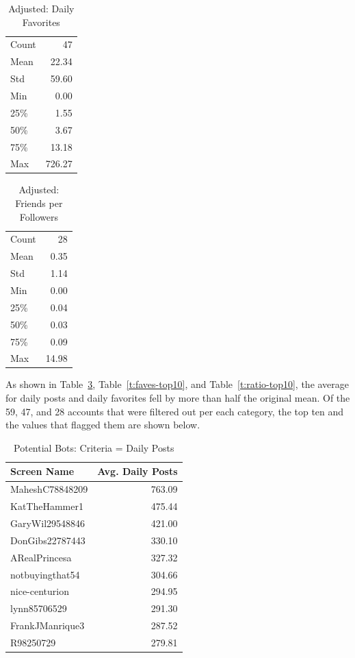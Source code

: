 \begin{table}[htb]
\centering
\caption{Adjusted: Daily Favorites}
\label{t:faves-delta}
\begin{tabular}{lr}
Count & 47  \\
Mean  & 22.34  \\
Std   & 59.60  \\
Min   & 0.00   \\
25\%  & 1.55   \\
50\%  & 3.67   \\
75\%  & 13.18  \\
Max   & 726.27
\end{tabular}
\end{table}

\begin{table}[htb]
\centering
\caption{Adjusted: Friends per Followers}
\label{t:ratio-delta}
\begin{tabular}{lr}
Count & 28 \\
Mean  & 0.35  \\
Std   & 1.14  \\
Min   & 0.00  \\
25\%  & 0.04  \\
50\%  & 0.03  \\
75\%  & 0.09  \\
Max   & 14.98 
\end{tabular}
\end{table}

As shown in Table~\ref{t:post-top10}, Table~\ref{t:faves-top10}, and
Table~\ref{t:ratio-top10}, the average for daily posts and daily favorites fell
by more than half the original mean. Of the 59, 47, and 28 accounts that were
filtered out per each category, the top ten and the values that flagged them
are shown below.

\begin{table}[htb]
\centering
\caption{Potential Bots: Criteria = Daily Posts}
\label{t:post-top10}
\begin{tabular}{lr}
Screen Name & Avg. Daily Posts \\
\toprule
MaheshC78848209 & 763.09  \\
KatTheHammer1   & 475.44  \\
GaryWil29548846 & 421.00  \\
DonGibs22787443 & 330.10  \\
ARealPrincesa   & 327.32  \\
notbuyingthat54 & 304.66  \\
nice-centurion  & 294.95  \\
lynn85706529    & 291.30  \\
FrankJManrique3 & 287.52  \\
R98250729       & 279.81  
\end{tabular}
\end{table}

